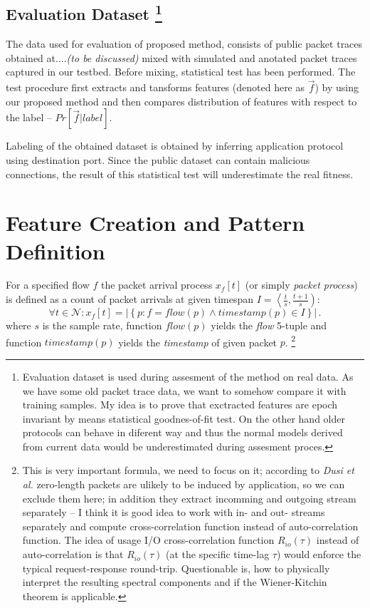 \subsection{Evaluation Dataset%
\footnote{Evaluation dataset is used during 
assesment of the method on real data.
As we have some old packet trace data, we want to somehow compare it with training samples.
My idea is to prove that exctracted features are epoch invariant by means
statistical goodnes-of-fit test.
On the other hand older protocols can behave in diferent way and thus the 
normal models derived from current data would be
underestimated during assesment proces.
}%
}
The data used for evaluation of proposed method, consists of public packet
traces obtained at....\emph{(to be discussed)}
mixed with simulated and anotated packet traces captured in our testbed.
Before mixing, statistical test has been performed.
The test procedure first extracts and tansforms features
(denoted here as $\vec{f}$) by using our proposed method 
and then compares distribution of features with respect to 
the label -- $Pr\left[ \vec{f} | label \right] $.

Labeling of the obtained dataset is obtained by inferring application 
protocol using destination port.
Since the public dataset can contain malicious connections, 
the result of this statistical test will underestimate the real fitness.

\section{Feature Creation and Pattern Definition}
For a specified flow $f$ the packet arrival process $x_f\left[t\right]$ 
(or simply \emph{packet process})  is defined as a count of packet arrivals 
at given timespan $I = \left\langle \frac{t}{s}, \frac{t+1}{s} \right)$:
\begin{equation}\label{packetprocess}
	 \forall t \in \mathcal{N} : x_f\left[t\right] = \left| 
	\left\lbrace p : f = flow(p) \wedge timestamp(p) \in I \right\rbrace \right|\, .
\end{equation}
where $s$ is the sample rate, function $flow(p)$  yields the \emph{flow} 5-tuple 
and function $timestamp(p)$  yields the \emph{timestamp} of given packet $p$. 
\footnote{
This is very important formula, we need to focus on it; according 
to \emph{Dusi et al.} \cite{dusi2009tunnel}
zero-length packets are ulikely to be induced by application, 
so we can exclude them here; in addition
they extract incomming and outgoing  stream separately -- 
I think it is good idea to work with in- and out- streams separately 
and compute cross-correlation function instead of auto-correlation function.
The idea of usage I/O cross-correlation function $R_{io}\left(\tau\right)$ 
instead of auto-correlation is that $R_{io}\left(\tau\right)$ (at the specific 
time-lag $\tau$) would enforce the typical request-response round-trip. 
Questionable is, how to physically interpret the resulting spectral components and if the Wiener-Kitchin theorem is applicable.
}

